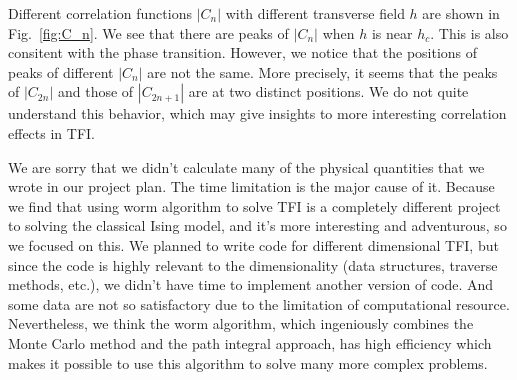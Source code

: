 \documentclass{article}
\theoremstyle{plain} \newtheorem{thm}{Theorem}[section]
\theoremstyle{definition} \newtheorem{df}{Definition}[section]
\theoremstyle{definition} \newtheorem{eg}{Example}
\theoremstyle{remark} \newtheorem*{rmk}{Remark}
\begin{document}
Different correlation functions $|C_n|$ with different transverse field $h$ are shown in Fig.~\ref{fig:C_n}. We see that there are peaks of $|C_n|$ when $h$ is near $h_c$. This is also consitent with the phase transition. However, we notice that the positions of peaks of different $|C_n|$ are not the same. More precisely, it seems that the peaks of $|C_{2n}|$ and those of $|C_{2n+1}|$ are at two distinct positions. We do not quite understand this behavior, which may give insights to more interesting correlation effects in TFI.

We are sorry that we didn't calculate many of the physical quantities that we wrote in our project plan. The time limitation is the major cause of it. Because we find that using worm algorithm to solve TFI is a completely different project to solving the classical Ising model, and it's more interesting and adventurous, so we focused on this. We planned to write code for different dimensional TFI, but since the code is highly relevant to the dimensionality (data structures, traverse methods, etc.), we didn't have time to implement another version of code. And some data are not so satisfactory due to the limitation of computational resource. Nevertheless, we think the worm algorithm, which ingeniously combines the Monte Carlo method and the path integral approach, has high efficiency which makes it possible to use this algorithm to solve many more complex problems.
\end{document}
